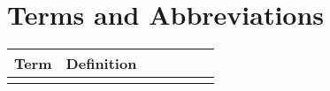 \thispagestyle{empty}

\section*{Terms and Abbreviations}\label{sec:terms}

\begin{tabular}[h]{rp{0.75\linewidth}}
    \hline
    \textbf{Term} & \textbf{Definition}\\
    \hline
    &\\
    \hline

\end{tabular}
